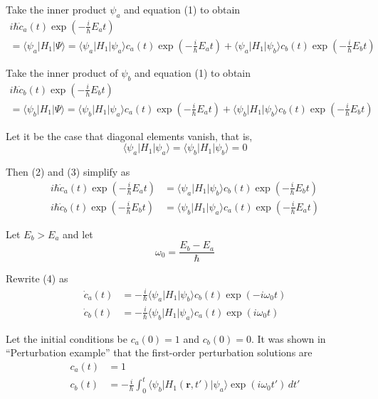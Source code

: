 Take the inner product $\psi_a$ and equation (1) to obtain
\begin{multline*}
i\hbar\dot c_a(t)\exp\left(-\tfrac{i}{\hbar}E_at\right)
\\
=\langle\psi_a|H_1|\Psi\rangle
=\langle\psi_a|H_1|\psi_a\rangle c_a(t)\exp\left(-\tfrac{i}{\hbar}E_at\right)
+\langle\psi_a|H_1|\psi_b\rangle c_b(t)\exp\left(-\tfrac{i}{\hbar}E_bt\right)
\tag{2}
\end{multline*}

Take the inner product of $\psi_b$ and equation (1) to obtain
\begin{multline*}
i\hbar\dot c_b(t)\exp\left(-\tfrac{i}{\hbar}E_bt\right)
\\
=\langle\psi_b|H_1|\Psi\rangle
=\langle\psi_b|H_1|\psi_a\rangle c_a(t)\exp\left(-\tfrac{i}{\hbar}E_at\right)
+\langle\psi_b|H_1|\psi_b\rangle c_b(t)\exp\left(-\tfrac{i}{\hbar}E_bt\right)
\tag{3}
\end{multline*}

Let it be the case that diagonal elements vanish, that is,
\begin{equation*}
\langle\psi_a|H_1|\psi_a\rangle=\langle\psi_b|H_1|\psi_b\rangle=0
\end{equation*}

Then (2) and (3) simplify as
\begin{equation*}
\begin{aligned}
i\hbar\dot c_a(t)\exp\left(-\tfrac{i}{\hbar}E_at\right)
&=\langle\psi_a|H_1|\psi_b\rangle c_b(t)\exp\left(-\tfrac{i}{\hbar}E_bt\right)
\\
i\hbar\dot c_b(t)\exp\left(-\tfrac{i}{\hbar}E_bt\right)
&=\langle\psi_b|H_1|\psi_a\rangle c_a(t)\exp\left(-\tfrac{i}{\hbar}E_at\right)
\end{aligned}
\tag{4}
\end{equation*}

Let $E_b>E_a$ and let
\begin{equation*}
\omega_0=\frac{E_b-E_a}{\hbar}
\end{equation*}

Rewrite (4) as
\begin{align*}
\dot c_a(t)&=-\frac{i}{\hbar}\langle\psi_a|H_1|\psi_b\rangle c_b(t)\exp(-i\omega_0t)
\\
\dot c_b(t)&=-\frac{i}{\hbar}\langle\psi_b|H_1|\psi_a\rangle c_a(t)\exp(i\omega_0t)
\end{align*}

Let the initial conditions be $c_a(0)=1$ and $c_b(0)=0$.
It was shown in ``Perturbation example'' that the first-order perturbation solutions are
\begin{align*}
c_a(t)&=1
\\
c_b(t)&=-\frac{i}{\hbar}\int_0^t
\langle\psi_b|H_1(\mathbf r,t')|\psi_a\rangle\exp(i\omega_0t')\,dt'
\end{align*}


